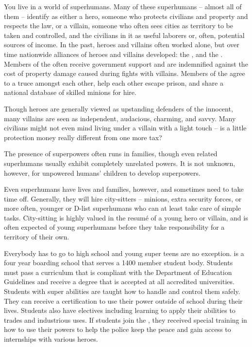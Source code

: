 \documentclass[blue]{LRSguildcamp1}
\begin{document}
\name{\bWorld{}}
You live in a world of superhumans.  Many of these superhumans -- almost all of them -- identify as either a hero, someone who protects civilians and property and respects the law, or a villain, someone who often sees cities as territory to be taken and controlled, and the civilians in it as useful laborers or, often, potential sources of income.  In the past, heroes and villains often worked alone, but over time nationwide alliances of heroes and villains developed: the \cHeroLeague{\intro}, and the \cVillainCompact{\intro}.  Members of the \cHeroLeague{\intro} often receive government support and are indemnified against the cost of property damage caused during fights with villains.  Members of the \cVillainCompact{\intro} agree to a truce amongst each other, help each other escape prison, and share a national database of skilled minions for hire.

Though heroes are generally viewed as upstanding defenders of the innocent, many villains are seen as independent, audacious, charming, and savvy.  Many civilians might not even mind living under a villain with a light touch -- is a little protection money really different from one more tax?

The presence of superpowers often runs in families, though even related superhumans usually exhibit completely unrelated powers.  It is not unknown, however, for unpowered humans' children to develop superpowers.

Even superhumans have lives and families, however, and sometimes need to take time off.  Generally, they will hire city-sitters -- minions, extra security forces, or more often, younger or D-list superhumans who can at least take care of simple tasks.  City-sitting is highly valued in the resum\'e of a young hero or villain, and is often expected of young superhumans before they take responsibility for a territory of their own.

Everybody has to go to high school and young super teens are no exception. \pSuperSchool{} is a four year boarding school that serves a 1400 member student body. Students must pass a curriculum that is compliant with the Department of Education Guidelines and receive a degree that is accepted at all accredited universities. Students with super abilities are taught how to handle and control them safely. They can receive a certification to use their power outside of school during their lives. Students also have electives including learning to apply their abilities to trades and industrious uses.  If students join the \cHeroLeague{\intro}, they received special training in how to use their powers to help the police keep the peace and gain access to internships with various heroes. 
\end{document}
